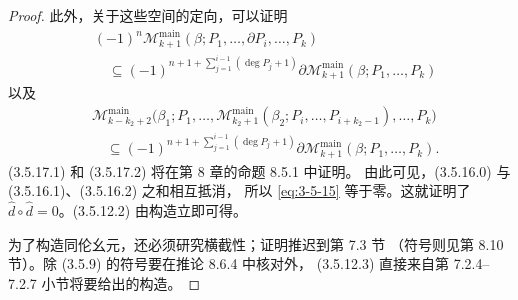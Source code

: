 \begin{proof}
此外，关于这些空间的定向，可以证明
\begin{equation}
\begin{aligned}
  &(-1)^n\mathcal M_{k+1}^{\mathrm{main}}
  (\beta;P_1,\ldots,\partial P_i,\ldots,P_k)\\
  &\quad\subseteq
  (-1)^{n+1+\sum_{j=1}^{i-1}(\deg P_j+1)}
  \partial\mathcal M_{k+1}^{\mathrm{main}}
  (\beta;P_1,\ldots,P_k)
\end{aligned}
\tag{3.5.17.1}\label{eq:3-5-17-1}
\end{equation}
以及
\begin{equation}
\begin{aligned}
  &\mathcal M_{k-k_2+2}^{\mathrm{main}}
  \bigl(\beta_1;P_1,\ldots,
  \mathcal M_{k_2+1}^{\mathrm{main}}
  (\beta_2;P_i,\ldots,P_{i+k_2-1}),\ldots,P_k\bigr)\\
  &\quad\subseteq
  (-1)^{n+1+\sum_{j=1}^{i-1}(\deg P_j+1)}
  \partial\mathcal M_{k+1}^{\mathrm{main}}
  (\beta;P_1,\ldots,P_k).
\end{aligned}
\tag{3.5.17.2}\label{eq:3-5-17-2}
\end{equation}
(3.5.17.1) 和 (3.5.17.2) 将在第 8 章的命题 8.5.1 中证明。
由此可见，(3.5.16.0) 与 (3.5.16.1)、(3.5.16.2) 之和相互抵消，
所以 \eqref{eq:3-5-15} 等于零。这就证明了
$\widehat d\circ\widehat d=0$。(3.5.12.2) 由构造立即可得。

为了构造同伦幺元，还必须研究横截性；证明推迟到第 7.3 节
（符号则见第 8.10 节）。除 (3.5.9) 的符号要在推论 8.6.4 中核对外，
(3.5.12.3) 直接来自第 7.2.4--7.2.7 小节将要给出的构造。
\end{proof}
